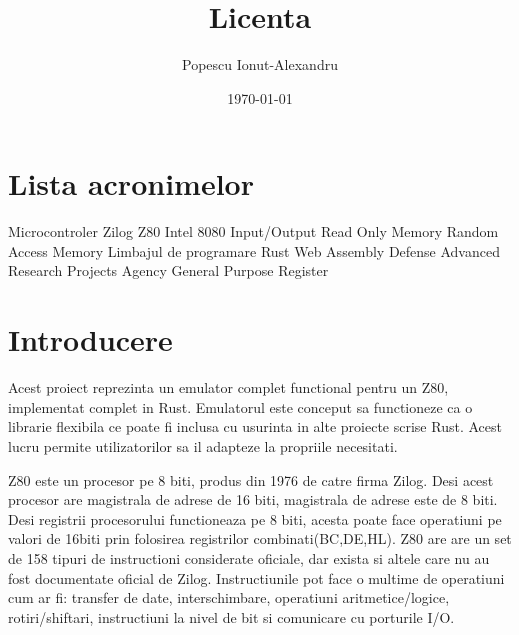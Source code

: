 \documentclass[titlepage,12pt]{article}
\begin{document}
    \title{Licenta}
    \author{Popescu Ionut-Alexandru}
    \date{\today}

    \maketitle
    \renewcommand{\contentsname}{Cuprins}
    \renewcommand{\listfigurename}{Lista figurilor}
    \renewcommand{\listtablename}{Lista tabelelor}
    \renewcommand{\figurename}{Figura}
    \renewcommand{\tablename}{Tabela}
    \renewcommand{\lstlistingname}{Cod}
    \tableofcontents
    \clearpage
    \listoffigures
    \clearpage
    \listoftables
    \clearpage
    \section*{Lista acronimelor} %
    \begin{acronym}
               {Microcontroler Zilog Z80}
             {Intel 8080}
                {Input/Output}
               {Read Only Memory}
               {Random Access Memory}
              {Limbajul de programare Rust}
              {Web Assembly}
             {Defense Advanced Research Projects Agency}
               {General Purpose Register}
    \end{acronym}
    \clearpage


    \section{Introducere}
    Acest proiect reprezinta un emulator complet functional pentru un \ac {Z80}, implementat complet in \ac {Rust}.
    Emulatorul este conceput sa functioneze ca o librarie flexibila ce poate fi inclusa cu usurinta in alte proiecte scrise Rust. Acest lucru permite utilizatorilor sa il adapteze la propriile necesitati.

    \ac {Z80} este un procesor pe 8 biti, produs din 1976 de catre firma Zilog. Desi acest procesor are magistrala de adrese de 16 biti, magistrala de adrese este de 8 biti.
    Desi registrii procesorului functioneaza pe 8 biti, acesta poate face operatiuni pe valori de 16biti prin folosirea registrilor combinati(BC,DE,HL).
    Z80 are are un set de 158 tipuri de instructioni considerate oficiale, dar exista si altele care nu au fost documentate oficial de Zilog. Instructiunile pot face o multime de operatiuni cum ar fi: transfer de date, interschimbare, operatiuni aritmetice/logice, rotiri/shiftari, instructiuni la nivel de bit si comunicare cu porturile I/O.
\end{document}
